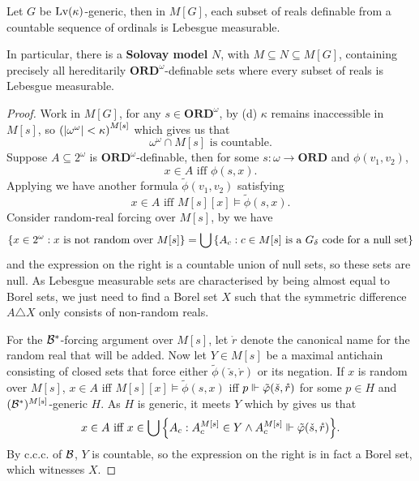 \begin{theorem}
    Let \(G\) be \(\operatorname{Lv}(\kappa)\)-generic,
    then in \(M[G]\), each subset of reals definable from a countable sequence of ordinals is Lebesgue measurable.

    In particular, there is a \textbf{Solovay model} \(N\), with \(M \subseteq N \subseteq M[G]\),
    containing precisely all hereditarily \(\mathbf{ORD}^\omega\)-definable sets where every subset of reals is Lebesgue measurable.
\end{theorem}
\begin{proof}
    Work in \(M[G]\),
    for any \(s\in\mathbf{ORD}^\omega\),
    by  (d) \(\kappa\) remains inaccessible in \(M[s]\),
    so \(\left(\left\lvert \omega^\omega \right\rvert < \kappa\right)^{M[s]}\) which gives us that
    \[ \omega^\omega \cap M[s] \text{ is countable}. \]
    Suppose \(A\subseteq 2^\omega\) is \(\mathbf{ORD}^\omega\)-definable,
    then for some \(s:\omega\to\mathbf{ORD}\) and \(\phi(v_1,v_2)\),
    \[ x\in A \text{ iff } \phi(s,x). \]
    Applying  we have another formula \(\tilde{\phi}(v_1,v_2)\) satisfying
    \[ x\in A \text{ iff } M[s][x] \models \tilde{\phi}(s,x). \]
    Consider random-real forcing over \(M[s]\), by  we have
    \[
        {\left\{ x\in2^\omega: x\text{ is not random over } M[s] \right\}}
        = \bigcup {\left\{ A_c: c\in M[s] \text{ is a } G_\delta \text{ code for a null set} \right\}}
    \]
    and the expression on the right is a countable union of null sets, so these sets are null.
    As Lebesgue measurable sets are characterised by being almost equal to Borel sets,
    we just need to find a Borel set \(X\) such that the symmetric difference \(A\triangle X\) only consists of non-random reals.

    For the \({\mathcal{B}}^*\)-forcing argument over \(M[s]\),
    let \(\mathring{r}\) denote the canonical name for the random real that will be added.
    Now let \(Y \in M[s]\) be a maximal antichain consisting of closed sets
    that force either \(\tilde{\phi}(\check{s},\mathring{r})\) or its negation.
    If \(x\) is random over \(M[s]\),
    \(x\in A\) iff \(M[s][x]\models \tilde{\phi}(s,x)\)
    iff \(p\Vdash \tilde{\varphi}(\check{s},\mathring{r})\) for some \(p\in H\) and \(({\mathcal{B}}^*)^{M[s]}\)-generic \(H\).
    As \(H\) is generic, it meets \(Y\) which by  gives us that
    \[ x\in A\text{ iff } x\in \bigcup{\left\{ A_c: A_c^{M[s]}\in Y\land A_c^{M[s]} \Vdash\tilde{\varphi}(\check{s},\mathring{r}) \right\}}. \]
    By c.c.c. of \({\mathcal{B}}\), \(Y\) is countable, so the expression on the right is in fact a Borel set,
    which witnesses \(X\).
\end{proof}

